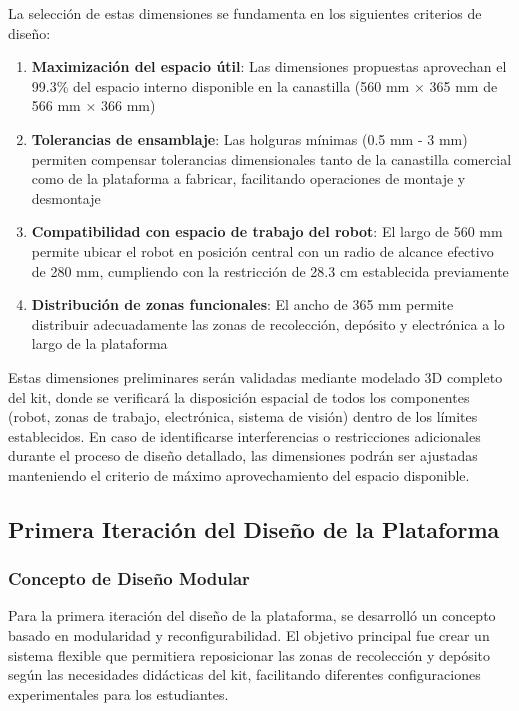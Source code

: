 La selección de estas dimensiones se fundamenta en los siguientes criterios de diseño:

\begin{enumerate}
    \item \textbf{Maximización del espacio útil}: Las dimensiones propuestas aprovechan el 99.3\% del espacio interno disponible en la canastilla (560 mm × 365 mm de 566 mm × 366 mm)
    
    \item \textbf{Tolerancias de ensamblaje}: Las holguras mínimas (0.5 mm - 3 mm) permiten compensar tolerancias dimensionales tanto de la canastilla comercial como de la plataforma a fabricar, facilitando operaciones de montaje y desmontaje
    
    \item \textbf{Compatibilidad con espacio de trabajo del robot}: El largo de 560 mm permite ubicar el robot en posición central con un radio de alcance efectivo de 280 mm, cumpliendo con la restricción de 28.3 cm establecida previamente
    
    \item \textbf{Distribución de zonas funcionales}: El ancho de 365 mm permite distribuir adecuadamente las zonas de recolección, depósito y electrónica a lo largo de la plataforma
\end{enumerate}

Estas dimensiones preliminares serán validadas mediante modelado 3D completo del kit, donde se verificará la disposición espacial de todos los componentes (robot, zonas de trabajo, electrónica, sistema de visión) dentro de los límites establecidos. En caso de identificarse interferencias o restricciones adicionales durante el proceso de diseño detallado, las dimensiones podrán ser ajustadas manteniendo el criterio de máximo aprovechamiento del espacio disponible.


\subsection{Primera Iteración del Diseño de la Plataforma}

\subsubsection{Concepto de Diseño Modular}

Para la primera iteración del diseño de la plataforma, se desarrolló un concepto basado en modularidad y reconfigurabilidad. El objetivo principal fue crear un sistema flexible que permitiera reposicionar las zonas de recolección y depósito según las necesidades didácticas del kit, facilitando diferentes configuraciones experimentales para los estudiantes.

